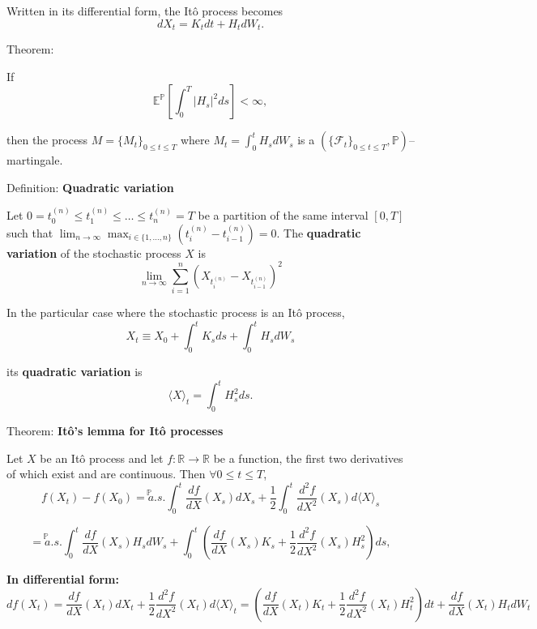\documentclass[12pt,a4paper]{article}
\begin{document}
Written in its differential form, the Itô process becomes
\[
dX_t = K_t dt + H_t dW_t.
\]
\vspace{1em}

Theorem: 

If 
\[
\mathbb{E}^{\mathbb{P}}\left[\int_0^T |H_s|^2 ds\right] < \infty, \tag{9}
\]

then the process $M = \{M_t\}_{0 \leq t \leq T}$ where $M_t = \int_0^t H_s dW_s$ is a $(\{\mathcal{F}_t\}_{0 \leq t \leq T}, \mathbb{P})$--martingale.
\vspace{1em}

Definition: \textbf{Quadratic variation}
\vspace{0.5em}

Let $0 = t_0^{(n)} \leq t_1^{(n)} \leq \ldots \leq t_n^{(n)} = T$ be a partition of the same interval $[0, T]$ such that $\lim_{n \to \infty} \max_{i \in \{1, \ldots, n\}} \left(t_i^{(n)} - t_{i-1}^{(n)}\right) = 0$. The \textbf{quadratic variation} of the stochastic process $X$ is
\[
\lim_{n \to \infty} \sum_{i=1}^{n} \left(X_{t_i^{(n)}} - X_{t_{i-1}^{(n)}}\right)^2
\]
\vspace{1em}

In the particular case where the stochastic process is an Itô process,
\[
X_t \equiv X_0 + \int_0^t K_s ds + \int_0^t H_s dW_s
\]

its \textbf{quadratic variation} is
\[
\langle X \rangle_t = \int_0^t H_s^2 ds.
\]
\vspace{1em}

Theorem: \textbf{Itô's lemma for Itô processes}
\vspace{0.5em}

Let $X$ be an Itô process and let $f : \mathbb{R} \to \mathbb{R}$ be a function, the first two derivatives of which exist and are continuous. Then $\forall 0 \leq t \leq T$,
\[
f(X_t) - f(X_0) \stackrel{\mathbb{P}}{=a.s.} \int_0^t \frac{df}{dX}(X_s) dX_s + \frac{1}{2} \int_0^t \frac{d^2f}{dX^2}(X_s) d\langle X \rangle_s \tag{10}
\]

\[
\stackrel{\mathbb{P}}{=a.s.} \int_0^t \frac{df}{dX}(X_s) H_s dW_s + \int_0^t \left(\frac{df}{dX}(X_s) K_s + \frac{1}{2} \frac{d^2f}{dX^2}(X_s) H_s^2 \right) ds,
\]

\textbf{In differential form:}
\[
df(X_t) = \frac{df}{dX}(X_t) dX_t + \frac{1}{2} \frac{d^2f}{dX^2}(X_t) d\langle X \rangle_t
= \left( \frac{df}{dX}(X_t) K_t + \frac{1}{2} \frac{d^2f}{dX^2}(X_t) H_t^2 \right) dt + \frac{df}{dX}(X_t) H_t dW_t
\]

\vspace{1em}
\end{document}
